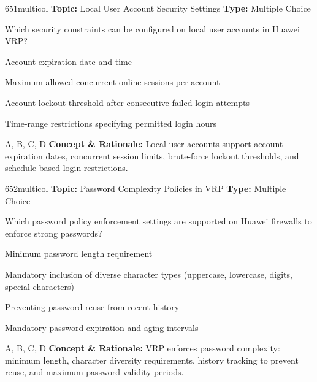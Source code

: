 \begin{qcard}{651}{multicol}
\textcolor{darkslate!75}{\small\textbf{Topic:} Local User Account Security Settings \hfill \textbf{Type:} Multiple Choice}\vspace{0.4em}\par
Which security constraints can be configured on local user accounts in Huawei VRP?
\begin{qoptions}
\item Account expiration date and time
\item Maximum allowed concurrent online sessions per account
\item Account lockout threshold after consecutive failed login attempts
\item Time-range restrictions specifying permitted login hours
\end{qoptions}
\end{qcard}
\nopagebreak
\begin{explainbox}{A, B, C, D}
\textbf{Concept \& Rationale:} Local user accounts support account expiration dates, concurrent session limits, brute-force lockout thresholds, and schedule-based login restrictions.
\end{explainbox}

\begin{qcard}{652}{multicol}
\textcolor{darkslate!75}{\small\textbf{Topic:} Password Complexity Policies in VRP \hfill \textbf{Type:} Multiple Choice}\vspace{0.4em}\par
Which password policy enforcement settings are supported on Huawei firewalls to enforce strong passwords?
\begin{qoptions}
\item Minimum password length requirement
\item Mandatory inclusion of diverse character types (uppercase, lowercase, digits, special characters)
\item Preventing password reuse from recent history
\item Mandatory password expiration and aging intervals
\end{qoptions}
\end{qcard}
\nopagebreak
\begin{explainbox}{A, B, C, D}
\textbf{Concept \& Rationale:} VRP enforces password complexity: minimum length, character diversity requirements, history tracking to prevent reuse, and maximum password validity periods.
\end{explainbox}

